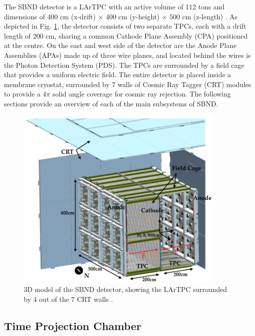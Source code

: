 The SBND detector is a LArTPC with an active volume of 112 tons and dimensions of 400 cm (x-drift) $\times$ 400 cm (y-height) $\times$ 500 cm (z-length) \cite{SBNProposal}.
As depicted in Fig. \ref{fig:SBND_Pretty}, the detector consists of two separate TPCs, each with a drift length of 200 cm, sharing a common Cathode Plane Assembly (CPA) positioned at the centre.
On the east and west side of the detector are the Anode Plane Assemblies (APAs) made up of three wire planes, and located behind the wires is the Photon Detection System (PDS).
The TPCs are surrounded by a field cage that provides a uniform electric field.
The entire detector is placed inside a membrane cryostat, surrounded by 7 walls of Cosmic Ray Tagger (CRT) modules to provide a 4$\pi$ solid angle coverage for cosmic ray rejection.
The following sections provide an overview of each of the main subsystems of SBND.

\begin{figure}[htbp] 
\centering    
\includegraphics[width=0.9\textwidth]{SBND_Pretty}
\caption[Short-Baseline Near Detector 3D Model]{
3D model of the SBND detector, showing the LArTPC surrounded by 4 out of the 7 CRT walls \cite{sbnd_pds_paper}. 
}
\label{fig:SBND_Pretty}
\end{figure}

\subsection{Time Projection Chamber}


